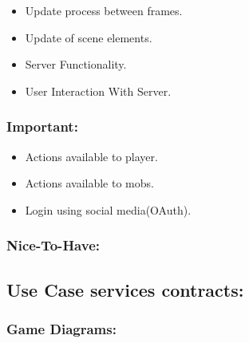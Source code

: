 \documentclass[letterpaper]{article}
\begin{document}
					\begin{itemize}
						\item Update process between frames.
						\item Update of scene elements.
						\item Server Functionality.
						\item User Interaction With Server.
					\end{itemize}	
					
				\vspace{0.2in}
				\subsubsection*{Important:}
				\vspace{0.2in}
				
					\begin{itemize}
						\item Actions available to player.
						\item Actions available to mobs.
						\item Login using social media(OAuth).
					\end{itemize}
				
				\vspace{0.2in}
				\subsubsection*{Nice-To-Have:}
				\vspace{0.2in}
					
			\vspace{0.2in}
			\subsection*{Use Case services contracts:}
			\vspace{0.1in}
				
				\subsubsection*{Game Diagrams:}
				\vspace{0.1in}
					
\end{document}

